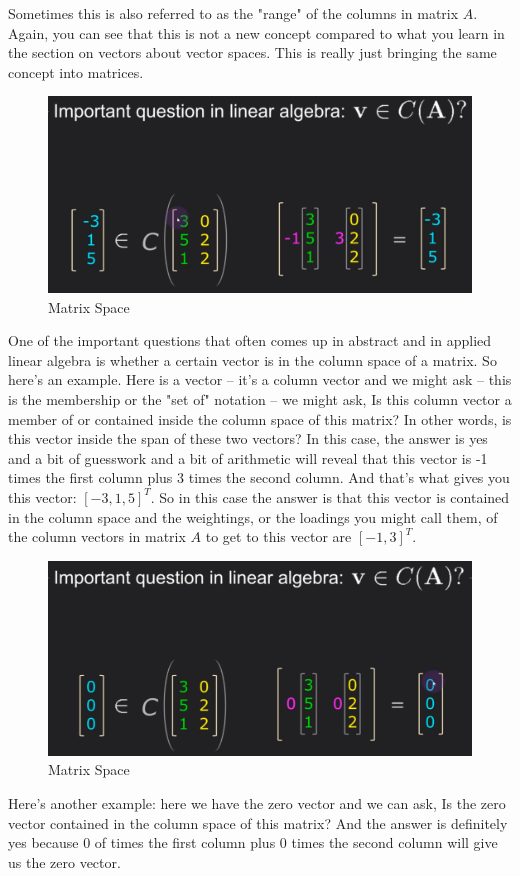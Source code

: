 \documentclass[fleqn,10pt]{olplainarticle}
\theoremstyle{definition}
\theoremstyle{remark}
\begin{document}
Sometimes this is also referred to as the "range" of the columns in matrix $A$. Again, you can see that this is not a new concept compared to what you learn in the section on vectors about vector spaces. This is really just bringing the same concept into matrices.

\begin{figure}[ht]
	\centering
	\includegraphics[width=0.5\linewidth]{images/matrix-space-03.png}
	\caption{Matrix Space}
	\label{fig:matrix_space_03}
\end{figure}

One of the important questions that often comes up in abstract and in applied linear algebra is whether a certain vector is in the column space of a matrix. So here's an example. Here is a vector -- it's a column vector and we might ask -- this is the membership or the "set of" notation -- we might ask, Is this column vector a member of or contained inside the column space of this matrix? In other words, is this vector inside the span of these two vectors? In this case, the answer is yes and a bit of guesswork and a bit of arithmetic will reveal that this vector is -1 times the first column plus 3 times the second column. And that's what gives you this vector: $[-3, 1, 5]^T$. So in this case the answer is that this vector is contained in the column space and the weightings, or the loadings you might call them, of the column vectors in matrix $A$ to get to this vector are $[-1, 3]^T$.

\begin{figure}[ht]
	\centering
	\includegraphics[width=0.5\linewidth]{images/matrix-space-04.png}
	\caption{Matrix Space}
	\label{fig:matrix_space_04}
\end{figure}

Here's another example: here we have the zero vector and we can ask, Is the zero vector contained in the column space of this matrix? And the answer is definitely yes because 0 of times the first column plus 0 times the second column will give us the zero vector.
\end{document}
